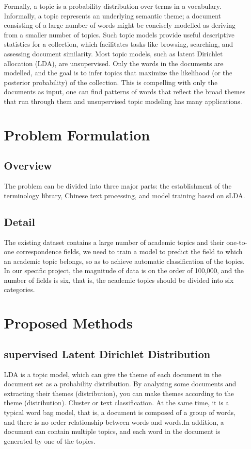 \documentclass{acmtog} %
\begin{document}
Formally, a topic is a probability distribution over terms in a vocabulary. Informally, a topic represents an underlying semantic theme; a document consisting of a large number of words might be concisely modelled as deriving from a smaller number of topics. Such topic models provide useful descriptive statistics for a collection, which facilitates tasks like browsing, searching, and assessing document similarity. Most topic models, such as latent Dirichlet allocation (LDA), are unsupervised. Only the words in the documents are modelled, and the goal is to infer topics that maximize the likelihood (or the posterior probability) of the collection. This is compelling with only the documents as input, one can find patterns of words that reflect the broad themes that run through them and unsupervised topic modeling has many applications.


\section{Problem Formulation}
\label{sec:biologicalreview}

\subsection{Overview}

The problem can be divided into three major parts: the establishment of the terminology library, Chinese text processing, and model training based on sLDA.

\subsection{Detail}

The existing dataset contains a large number of academic topics and their one-to-one correspondence fields, we need to train a model to predict the field to which an academic topic belongs, so as to achieve automatic classification of the topics.
In our specific project, the magnitude of data is on the order of 100,000, and the number of fields is six, that is, the academic topics should be divided into six categories.


\section{Proposed Methods}
\label{sub:models_of_pupil_dynamics}

\subsection{supervised Latent Dirichlet Distribution}
LDA is a topic model, which can give the theme of each document in the document set as a probability distribution. By analyzing some documents and extracting their themes (distribution), you can make themes according to the theme (distribution). Cluster or text classification. At the same time, it is a typical word bag model, that is, a document is composed of a group of words, and there is no order relationship between words and words.In addition, a document can contain multiple topics, and each word in the document is generated by one of the topics.
\end{document}
